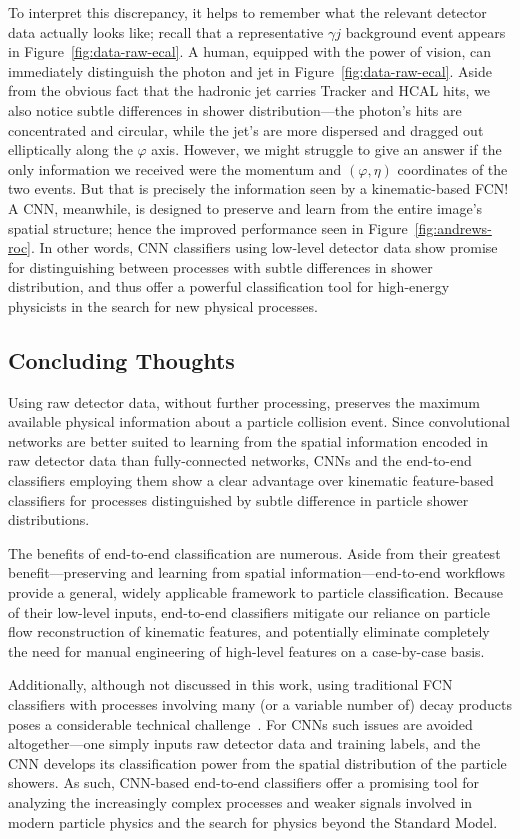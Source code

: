 \documentclass[11pt, a4paper]{article}
\begin{document}
To interpret this discrepancy, it helps to remember what the relevant detector data actually looks like; recall that a representative $ \gamma j $ background event appears in Figure~\ref{fig:data-raw-ecal}.
A human, equipped with the power of vision, can immediately distinguish the photon and jet in Figure~\ref{fig:data-raw-ecal}.
Aside from the obvious fact that the hadronic jet carries Tracker and HCAL hits, we also notice subtle differences in shower distribution---the photon's hits are concentrated and circular, while the jet's are more dispersed and dragged out elliptically along the $ \varphi $ axis.
However, we might struggle to give an answer if the only information we received were the momentum and $ (\varphi, \eta) $ coordinates of the two events.
But that is precisely the information seen by a kinematic-based FCN! A CNN, meanwhile, is designed to preserve and learn from the entire image's spatial structure; hence the improved performance seen in Figure~\ref{fig:andrews-roc}.
In other words, CNN classifiers using low-level detector data show promise for distinguishing between processes with subtle differences in shower distribution, and thus offer a powerful classification tool for high-energy physicists in the search for new physical processes.

\subsection{Concluding Thoughts}
Using raw detector data, without further processing, preserves the maximum available physical information about a particle collision event.
Since convolutional networks are better suited to learning from the spatial information encoded in raw detector data than fully-connected networks, CNNs and the end-to-end classifiers employing them show a clear advantage over kinematic feature-based classifiers for processes distinguished by subtle difference in particle shower distributions.

The benefits of end-to-end classification are numerous.
Aside from their greatest benefit---preserving and learning from spatial information---end-to-end workflows provide a general, widely applicable framework to particle classification.
Because of their low-level inputs, end-to-end classifiers mitigate our reliance on particle flow reconstruction of kinematic features, and potentially eliminate completely the need for manual engineering of high-level features on a case-by-case basis.

Additionally, although not discussed in this work, using traditional FCN classifiers with processes involving many (or a variable number of) decay products poses a considerable technical challenge~\cite{andrews-higgs}.
For CNNs such issues are avoided altogether---one simply inputs raw detector data and training labels, and the CNN develops its classification power from the spatial distribution of the particle showers.
As such, CNN-based end-to-end classifiers offer a promising tool for analyzing the increasingly complex processes and weaker signals involved in modern particle physics and the search for physics beyond the Standard Model.
\end{document}
